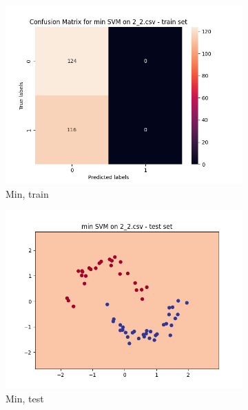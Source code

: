 \documentclass[12pt]{article}
\newcommand*{\subfigwidth}{0.24\textwidth}
\begin{document}
\begin{figure}[H]
\begin{subfigure}[t]{\subfigwidth}
        \includegraphics[width=\linewidth]{img/exp_2/svm/2_2/min/train_matrix.png}
        \caption{Min, train}
    \end{subfigure}
    \hfill
    \begin{subfigure}[t]{\subfigwidth}
        \includegraphics[width=\linewidth]{img/exp_2/svm/2_2/min/test_boundary.png}
        \caption{Min, test}
    \end{subfigure}
    \hfill
    \begin{subfigure}[t]{\subfigwidth}

\end{subfigure}
\end{figure}
\end{document}

